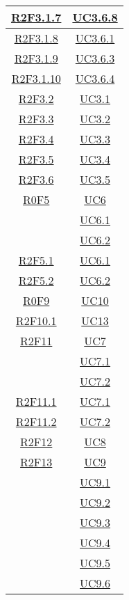 \begin{longtable}{|c|c|}
\hline
\hyperlink{R2F3.1.7}{R2F3.1.7} & \hyperlink{UC3.6.8}{UC3.6.8}\\
\hline
\hyperlink{R2F3.1.8}{R2F3.1.8} & \hyperlink{UC3.6.1}{UC3.6.1}\\
\hline
\hyperlink{R2F3.1.9}{R2F3.1.9} & \hyperlink{UC3.6.3}{UC3.6.3}\\
\hline
\hyperlink{R2F3.1.10}{R2F3.1.10} & \hyperlink{UC3.6.4}{UC3.6.4}\\
\hline
\hyperlink{R2F3.2}{R2F3.2} & \hyperlink{UC3.1}{UC3.1}\\
\hline
\hyperlink{R2F3.3}{R2F3.3} & \hyperlink{UC3.2}{UC3.2}\\
\hline
\hyperlink{R2F3.4}{R2F3.4} & \hyperlink{UC3.3}{UC3.3}\\
\hline
\hyperlink{R2F3.5}{R2F3.5} & \hyperlink{UC3.4}{UC3.4}\\
\hline
\hyperlink{R2F3.6}{R2F3.6} & \hyperlink{UC3.5}{UC3.5}\\
\hline
\hyperlink{R0F5}{R0F5} & \hyperlink{UC6}{UC6}\\
& \hyperlink{UC6.1}{UC6.1}\\
& \hyperlink{UC6.2}{UC6.2}\\
\hline
\hyperlink{R2F5.1}{R2F5.1} & \hyperlink{UC6.1}{UC6.1}\\
\hline
\hyperlink{R2F5.2}{R2F5.2} & \hyperlink{UC6.2}{UC6.2}\\
\hline
\hyperlink{R0F9}{R0F9} & \hyperlink{UC10}{UC10}\\
\hline
\hyperlink{R2F10.1}{R2F10.1} & \hyperlink{UC13}{UC13}\\
\hline
\hyperlink{R2F11}{R2F11} & \hyperlink{UC7}{UC7}\\
& \hyperlink{UC7.1}{UC7.1}\\
& \hyperlink{UC7.2}{UC7.2}\\
\hline
\hyperlink{R2F11.1}{R2F11.1} & \hyperlink{UC7.1}{UC7.1}\\
\hline
\hyperlink{R2F11.2}{R2F11.2} & \hyperlink{UC7.2}{UC7.2}\\
\hline
\hyperlink{R2F12}{R2F12} & \hyperlink{UC8}{UC8}\\
\hline
\hyperlink{R2F13}{R2F13} & \hyperlink{UC9}{UC9}\\
& \hyperlink{UC9.1}{UC9.1}\\
& \hyperlink{UC9.2}{UC9.2}\\
& \hyperlink{UC9.3}{UC9.3}\\
& \hyperlink{UC9.4}{UC9.4}\\
& \hyperlink{UC9.5}{UC9.5}\\
& \hyperlink{UC9.6}{UC9.6}\\

\end{longtable}
